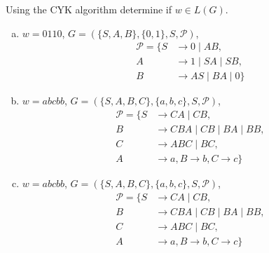 \documentclass[a4paper,12pt]{amsart}
\begin{document}
\medskip\begin{problem}
    
    Using the CYK algorithm determine if $w\in L(G)$.

    \begin{enumerate}[(a)]\setlength{\itemsep}{3pt}

        \item $w=0110$, $G=(\{S,A,B\},\{0, 1\},S,\mathcal P)$,        
        \begin{align*}
            \mathcal P=\{S&\rightarrow 0\mid AB, \\
            A&\rightarrow 1\mid SA\mid SB, \\
            B&\rightarrow AS \mid BA \mid 0\}
        \end{align*}
    
        \item $w=abcbb$, $G=(\{S,A,B,C\},\{a,b,c\},S,\mathcal P)$, 
        \begin{align*}
            \mathcal P=\{S&\rightarrow CA\mid CB, \\
            B&\rightarrow CBA\mid CB\mid BA\mid BB, \\
            C&\rightarrow ABC\mid BC,\\
            A&\rightarrow a, B\rightarrow b, C\rightarrow c\}
        \end{align*}
    
        \item $w=abcbb$, $G=(\{S,A,B,C\},\{a,b,c\},S,\mathcal P)$,
        \begin{align*}
            \mathcal P=\{S&\rightarrow CA\mid CB, \\
            B&\rightarrow CBA\mid CB\mid BA\mid BB, \\
            C&\rightarrow ABC\mid BC,\\
            A&\rightarrow a, B\rightarrow b, C\rightarrow c\}
        \end{align*}

    \end{enumerate}

\end{problem}
    
\end{document}
